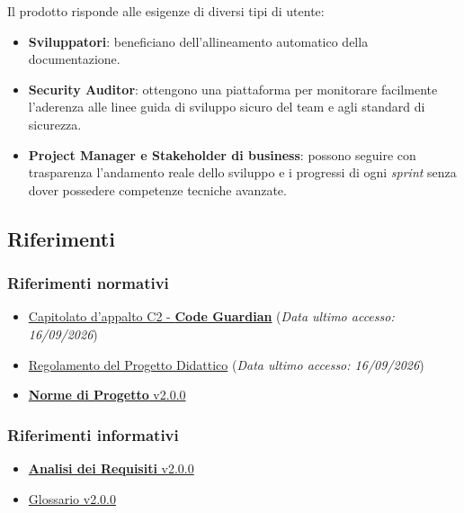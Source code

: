 \documentclass[12pt, a4paper]{article}
\begin{document}
Il prodotto risponde alle esigenze di diversi tipi di utente:
\begin{itemize}
    \item \textbf{Sviluppatori}: beneficiano dell'allineamento automatico della documentazione.
    \item \textbf{Security Auditor}: ottengono una piattaforma per monitorare facilmente l'aderenza alle linee guida di sviluppo sicuro del team e agli standard di sicurezza.
    \item \textbf{Project Manager e Stakeholder di business}: possono seguire con trasparenza l'andamento reale dello sviluppo e i progressi di ogni \textit{sprint} senza dover possedere competenze tecniche avanzate.
\end{itemize}

\subsection{Riferimenti}
\subsubsection{Riferimenti normativi}
\begin{itemize}
\item
  \href{https://www.math.unipd.it/~tullio/IS-1/2025/Progetto/C2p.pdf}{Capitolato d'appalto C2 - \textbf{Code Guardian}} (\textit{Data ultimo accesso: 16/09/2026})
\item
  \href{https://www.math.unipd.it/~tullio/IS-1/2025/Dispense/PD1.pdf}{Regolamento del Progetto Didattico} (\textit{Data ultimo accesso: 16/09/2026})
  \item \href{https://skynetunigroup.github.io/Code_Guardian/Documentazione/PB/norme_di_progetto_v2.0.0.pdf}{\textbf{Norme di Progetto} v2.0.0}


\end{itemize}


\subsubsection{Riferimenti informativi}
\begin{itemize}
\item \href{https://skynetunigroup.github.io/Code_Guardian/Documentazione/PB/analisi_dei_requisiti_v2.0.0.pdf}{\textbf{Analisi dei Requisiti} v2.0.0}
\item \href{https://skynetunigroup.github.io/Code_Guardian/Documentazione/PB/glossario_v2.0.0.pdf}{Glossario v2.0.0}
\end{itemize}
\end{document}
